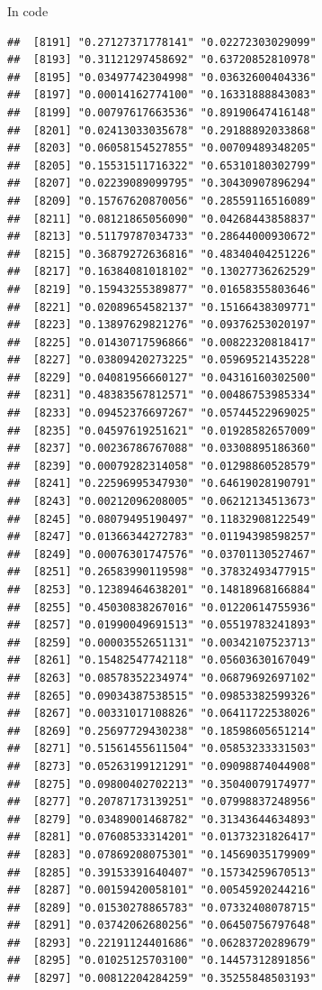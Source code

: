 \documentclass[ignorenonframetext,]{beamer}
\begin{document}
\begin{frame}[fragile]{In code}
\begin{verbatim}
##  [8191] "0.27127371778141" "0.02272303029099"
##  [8193] "0.31121297458692" "0.63720852810978"
##  [8195] "0.03497742304998" "0.03632600404336"
##  [8197] "0.00014162774100" "0.16331888843083"
##  [8199] "0.00797617663536" "0.89190647416148"
##  [8201] "0.02413033035678" "0.29188892033868"
##  [8203] "0.06058154527855" "0.00709489348205"
##  [8205] "0.15531511716322" "0.65310180302799"
##  [8207] "0.02239089099795" "0.30430907896294"
##  [8209] "0.15767620870056" "0.28559116516089"
##  [8211] "0.08121865056090" "0.04268443858837"
##  [8213] "0.51179787034733" "0.28644000930672"
##  [8215] "0.36879272636816" "0.48340404251226"
##  [8217] "0.16384081018102" "0.13027736262529"
##  [8219] "0.15943255389877" "0.01658355803646"
##  [8221] "0.02089654582137" "0.15166438309771"
##  [8223] "0.13897629821276" "0.09376253020197"
##  [8225] "0.01430717596866" "0.00822320818417"
##  [8227] "0.03809420273225" "0.05969521435228"
##  [8229] "0.04081956660127" "0.04316160302500"
##  [8231] "0.48383567812571" "0.00486753985334"
##  [8233] "0.09452376697267" "0.05744522969025"
##  [8235] "0.04597619251621" "0.01928582657009"
##  [8237] "0.00236786767088" "0.03308895186360"
##  [8239] "0.00079282314058" "0.01298860528579"
##  [8241] "0.22596995347930" "0.64619028190791"
##  [8243] "0.00212096208005" "0.06212134513673"
##  [8245] "0.08079495190497" "0.11832908122549"
##  [8247] "0.01366344272783" "0.01194398598257"
##  [8249] "0.00076301747576" "0.03701130527467"
##  [8251] "0.26583990119598" "0.37832493477915"
##  [8253] "0.12389464638201" "0.14818968166884"
##  [8255] "0.45030838267016" "0.01220614755936"
##  [8257] "0.01990049691513" "0.05519783241893"
##  [8259] "0.00003552651131" "0.00342107523713"
##  [8261] "0.15482547742118" "0.05603630167049"
##  [8263] "0.08578352234974" "0.06879692697102"
##  [8265] "0.09034387538515" "0.09853382599326"
##  [8267] "0.00331017108826" "0.06411722538026"
##  [8269] "0.25697729430238" "0.18598605651214"
##  [8271] "0.51561455611504" "0.05853233331503"
##  [8273] "0.05263199121291" "0.09098874044908"
##  [8275] "0.09800402702213" "0.35040079174977"
##  [8277] "0.20787173139251" "0.07998837248956"
##  [8279] "0.03489001468782" "0.31343644634893"
##  [8281] "0.07608533314201" "0.01373231826417"
##  [8283] "0.07869208075301" "0.14569035179909"
##  [8285] "0.39153391640407" "0.15734259670513"
##  [8287] "0.00159420058101" "0.00545920244216"
##  [8289] "0.01530278865783" "0.07332408078715"
##  [8291] "0.03742062680256" "0.06450756797648"
##  [8293] "0.22191124401686" "0.06283720289679"
##  [8295] "0.01025125703100" "0.14457312891856"
##  [8297] "0.00812204284259" "0.35255848503193"

\end{verbatim}
\end{frame}
\end{document}
